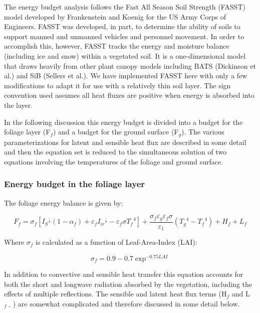 The energy budget analysis follows the Fast All Season Soil Strength (FASST) model developed by Frankenstein and Koenig for the US Army Corps of Engineers. FASST was developed, in part, to determine the ability of soils to support manned and unmanned vehicles and personnel movement. In order to accomplish this, however, FASST tracks the energy and moisture balance (including ice and snow) within a vegetated soil. It is a one-dimensional model that draws heavily from other plant canopy models including BATS (Dickinson et al.) and SiB (Sellers et al.). We have implemented FASST here with only a few modifications to adapt it for use with a relatively thin soil layer. The sign convention used assumes all heat fluxes are positive when energy is absorbed into the layer.

In the following discussion this energy budget is divided into a budget for the foliage layer (F\(_{f}\)) and a budget for the ground surface (F\(_{g}\)). The various parameterizations for latent and sensible heat flux are described in some detail and then the equation set is reduced to the simultaneous solution of two equations involving the temperatures of the foliage and ground surface.

\subsubsection{Energy budget in the foliage layer}\label{energy-budget-in-the-foliage-layer}

The foliage energy balance is given by:

\begin{equation}
{F_f} = {\sigma_f}\left[ {{I_S}^ \downarrow (1 - {\alpha_f}) + {\varepsilon_f}{I_{ir}}^ \downarrow  - {\varepsilon_f}\sigma {T_f}^4} \right] + \frac{{{\sigma_f}{\varepsilon_g}{\varepsilon_f}\sigma }}{{{\varepsilon_1}}}\left( {{T_g}^4 - {T_f}^4} \right) + {H_f} + {L_f}
\end{equation}

Where $\sigma$\(_{f}\) is calculated as a function of Leaf-Area-Index (LAI):

\begin{equation}
\sigma_f = 0.9 - 0.7 \exp^{-0.75 LAI}
\end{equation}

In addition to convective and sensible heat transfer this equation accounts for both the short and longwave radiation absorbed by the vegetation, including the effects of multiple reflections. The sensible and latent heat flux terms (H\(_{f}\) and L\(_{f-}\)) are somewhat complicated and therefore discussed in some detail below.

